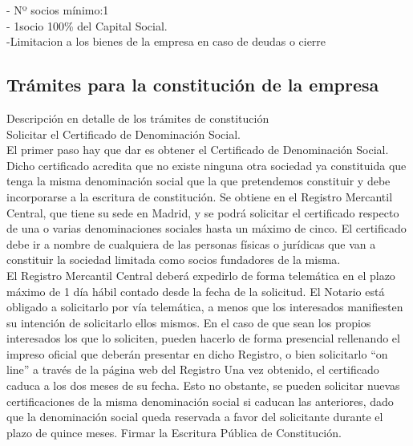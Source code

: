- Nº socios mínimo:1 \\
- 1socio 100\% del Capital Social.\\
-Limitacion a los bienes de la empresa en caso de deudas o cierre \\
\subsection{Trámites para la constitución de la empresa}
Descripción en detalle de los trámites de constitución\\
Solicitar el Certificado de Denominación Social.\\

El primer paso hay que dar es obtener el Certificado de Denominación Social. Dicho certificado acredita que no existe ninguna otra sociedad ya constituida que tenga la misma denominación social que la que pretendemos constituir y debe incorporarse a la escritura de constitución.
Se obtiene en el Registro Mercantil Central, que tiene su sede en Madrid, y se podrá solicitar el certificado respecto de una o varias denominaciones sociales hasta un máximo de cinco. El certificado debe ir a nombre de cualquiera de las personas físicas o jurídicas que van a constituir la sociedad limitada como socios fundadores de la misma.\\

El Registro Mercantil Central deberá expedirlo de forma telemática en el plazo máximo de 1 día hábil contado desde la fecha de la solicitud.
El Notario está obligado a solicitarlo por vía telemática, a menos que los interesados manifiesten su intención de solicitarlo ellos mismos.
En el caso de que sean los propios interesados los que lo soliciten, pueden hacerlo de forma presencial rellenando el impreso oficial que deberán presentar en dicho Registro, o bien solicitarlo “on line” a través de la página web del Registro 
Una vez obtenido, el certificado caduca a los dos meses de su fecha. Esto no obstante, se pueden solicitar nuevas certificaciones de la misma denominación social si caducan las anteriores, dado que la denominación social queda reservada a favor del solicitante durante el plazo de quince meses.
Firmar la Escritura Pública de Constitución.\\

